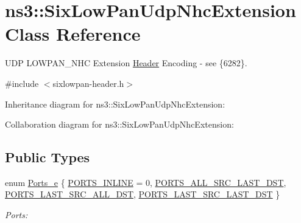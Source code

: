 \hypertarget{classns3_1_1SixLowPanUdpNhcExtension}{}\section{ns3\+:\+:Six\+Low\+Pan\+Udp\+Nhc\+Extension Class Reference}
\label{classns3_1_1SixLowPanUdpNhcExtension}


U\+DP L\+O\+W\+P\+A\+N\+\_\+\+N\+HC Extension \hyperlink{classns3_1_1Header}{Header} Encoding -\/ see \{6282\}.  




{\ttfamily \#include $<$sixlowpan-\/header.\+h$>$}



Inheritance diagram for ns3\+:\+:Six\+Low\+Pan\+Udp\+Nhc\+Extension\+:


Collaboration diagram for ns3\+:\+:Six\+Low\+Pan\+Udp\+Nhc\+Extension\+:
\subsection*{Public Types}
\begin{DoxyCompactItemize}
\item 
enum \hyperlink{classns3_1_1SixLowPanUdpNhcExtension_a77005f9c06de72b1a6ea105a23bf413b}{Ports\+\_\+e} \{ \hyperlink{classns3_1_1SixLowPanUdpNhcExtension_a77005f9c06de72b1a6ea105a23bf413ba6579ce5e13ed97d8d896694c08d24caf}{P\+O\+R\+T\+S\+\_\+\+I\+N\+L\+I\+NE} = 0, 
\hyperlink{classns3_1_1SixLowPanUdpNhcExtension_a77005f9c06de72b1a6ea105a23bf413bae7a4cf154bbe4889459921e80e198fd6}{P\+O\+R\+T\+S\+\_\+\+A\+L\+L\+\_\+\+S\+R\+C\+\_\+\+L\+A\+S\+T\+\_\+\+D\+ST}, 
\hyperlink{classns3_1_1SixLowPanUdpNhcExtension_a77005f9c06de72b1a6ea105a23bf413ba2f35b94c80f56d7da66128f77b0d1f8f}{P\+O\+R\+T\+S\+\_\+\+L\+A\+S\+T\+\_\+\+S\+R\+C\+\_\+\+A\+L\+L\+\_\+\+D\+ST}, 
\hyperlink{classns3_1_1SixLowPanUdpNhcExtension_a77005f9c06de72b1a6ea105a23bf413baef8af6ce660592f4b15a9953fdb94020}{P\+O\+R\+T\+S\+\_\+\+L\+A\+S\+T\+\_\+\+S\+R\+C\+\_\+\+L\+A\+S\+T\+\_\+\+D\+ST}
 \}\begin{DoxyCompactList}\small\item\em Ports\+: \end{DoxyCompactList}
\end{DoxyCompactItemize}
